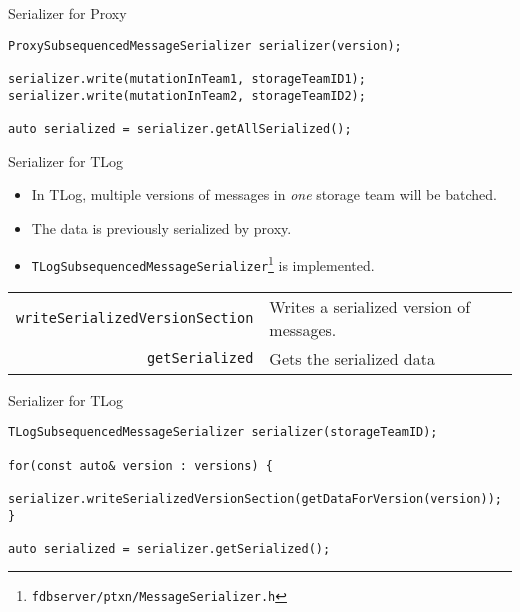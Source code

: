 \documentclass[9pt]{beamer}
\begin{document}
    \begin{frame}[fragile]{Serializer for Proxy}
             \begin{lstlisting}
ProxySubsequencedMessageSerializer serializer(version);

serializer.write(mutationInTeam1, storageTeamID1);
serializer.write(mutationInTeam2, storageTeamID2);

auto serialized = serializer.getAllSerialized();
        \end{lstlisting}
    \end{frame}

    \begin{frame}{Serializer for TLog}
        \begin{itemize}
            \item In TLog, multiple versions of messages in \emph{one} storage team will be batched.
            \item The data is previously serialized by proxy.
            \item \texttt{TLogSubsequencedMessageSerializer}\footnote{\texttt{fdbserver/ptxn/MessageSerializer.h}} is implemented.
        \end{itemize}
        \begin{center}
            \begin{tabular}{rl}
                \texttt{writeSerializedVersionSection} & Writes a serialized version of messages. \\
                \texttt{getSerialized} & Gets the serialized data
            \end{tabular}
        \end{center}
    \end{frame}

    \begin{frame}[fragile]{Serializer for TLog}
        \begin{lstlisting}
TLogSubsequencedMessageSerializer serializer(storageTeamID);

for(const auto& version : versions) {
    serializer.writeSerializedVersionSection(getDataForVersion(version));
}

auto serialized = serializer.getSerialized();
        \end{lstlisting}
    \end{frame}
\end{document}
